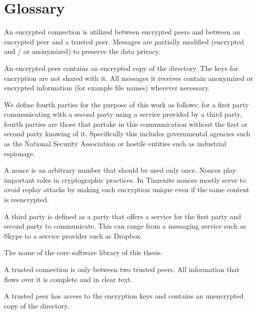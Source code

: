 \chapter{Glossary}
\label{chap:glossary}

\begin{description}[leftmargin=2em,style=nextline,noitemsep,nolistsep]
    \item[Encrypted Connection]
        An encrypted connection is utilized between encrypted peers and between an encrypted peer and a trusted peer.
        Messages are partially modified (encrypted and / or anonymized) to preserve the data privacy.
    \item[Encrypted Peer]
        An encrypted peer contains an encrypted copy of the directory.
        The keys for encryption are not shared with it.
        All messages it receives contain anonymized or encrypted information (for example file names) wherever necessary.
    \item[Fourth Party]
        We define fourth parties for the purpose of this work as follows: for a first party communicating with a second party using a service provided by a third party, fourth parties are those that partake in this communication without the first or second party knowing of it.
        Specifically this includes governmental agencies such as the National Security Association or hostile entities such as industrial espionage.
    \item[Nonce]
        A nonce is an arbitrary number that should be used only once.
        Nonces play important roles in cryptographic practices.
        In Tinzenite nonces mostly serve to avoid replay attacks by making each encryption unique even if the same content is reencrypted.
    \item[Third Party]
        A third party is defined as a party that offers a service for the first party and second party to communicate.
        This can range from a messaging service such as Skype to a service provider such as Dropbox.
    \item[Tinzenite]
        The name of the core software library of this thesis.
    \item[Trusted Connection]
        A trusted connection is only between two trusted peers.
        All information that flows over it is complete and in clear text.
    \item[Trusted Peer]
        A trusted peer has access to the encryption keys and contains an unencrypted copy of the directory.
\end{description}
